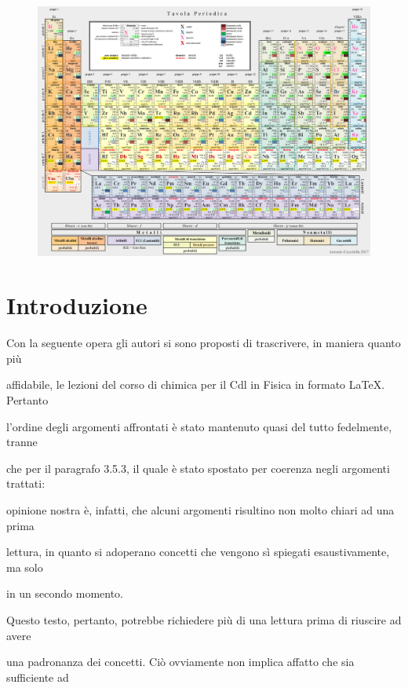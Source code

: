 \documentclass[openany,12pt]{book}%
\newcommand\blankpage{%
    \null
    \thispagestyle{empty}%
    \newpage}
\begin{document}
\begin{figure}[H]
    \includegraphics[angle=90,origin=c]{immagini/tavola periodica.png}
\end{figure}

\afterpage{\blankpage}

\tableofcontents

\chapter*{Introduzione}

Con la seguente opera gli autori si sono proposti di trascrivere, in maniera quanto più

affidabile, le lezioni del corso di chimica per il Cdl in Fisica in formato \LaTeX. Pertanto

l'ordine degli argomenti affrontati è stato mantenuto quasi del tutto fedelmente, tranne

che per il paragrafo 3.5.3, il quale è stato spostato per coerenza negli argomenti trattati:

opinione nostra è, infatti, che alcuni argomenti risultino non molto chiari ad una prima

lettura, in quanto si adoperano concetti che vengono sì spiegati esaustivamente, ma solo

in un secondo momento.

\vspace{0.2cm}
Questo testo, pertanto, potrebbe richiedere più di una lettura prima di riuscire ad avere

una padronanza dei concetti. Ciò ovviamente non implica affatto che sia sufficiente ad
\end{document}
